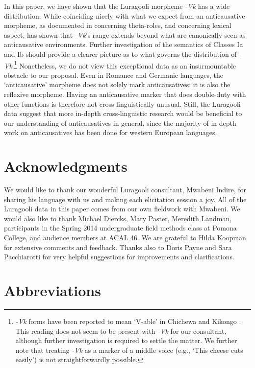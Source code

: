\documentclass[output=paper]{langsci/langscibook}
\begin{document}
In this paper, we have shown that the Luragooli morpheme \textit{-Vk} has a wide distribution. While coinciding nicely with what we expect from an anticausative morpheme, as documented in  concerning theta-roles, and  concerning lexical aspect,  has shown that \textit{-Vk}’s range extends beyond what are canonically seen as anticausative environments. Further investigation of the semantics of Classes Ia and Ib should provide a clearer picture as to what governs the distribution of \textit{-Vk}.\footnote{\textit{-Vk} forms have been reported to mean ‘V-able’ in Chichewa \citep{Simango2009} and Kikongo \citep{Fernando2013}. This reading does not seem to be present with \textit{-Vk} for our consultant, although further investigation is required to settle the matter. We further note that treating \textit{-Vk} as a marker of a middle voice (e.g., ‘This cheese cuts easily’) is not straightforwardly possible.} Nonetheless, we do not view this exceptional data as an insurmountable obstacle to our proposal. Even in Romance and Germanic languages, the ‘anticausative’ morpheme does not solely mark anticausatives: it is also the reflexive morpheme. Having an anticausative marker that does double-duty with other functions is therefore not cross-linguistically unusual. Still, the Luragooli data suggest that more in-depth cross-linguistic research would be beneficial to our understanding of anticausatives in general, since the majority of in depth work on anticausatives has been done for western European languages.

\section*{Acknowledgments}

We would like to thank our wonderful Luragooli consultant, Mwabeni Indire, for sharing his language with us and making each elicitation session a joy. All of the Luragooli data in this paper comes from our own fieldwork with Mwabeni. We would also like to thank Michael Diercks, Mary Paster, Meredith Landman, participants in the Spring 2014 undergraduate field methods class at Pomona College, and audience members at ACAL 46. We are grateful to Hilda Koopman for extensive comments and feedback. Thanks also to Doris Payne and Sara Pacchiarotti for very helpful suggestions for improvements and clarifications.

\section*{Abbreviations}
\end{document}
